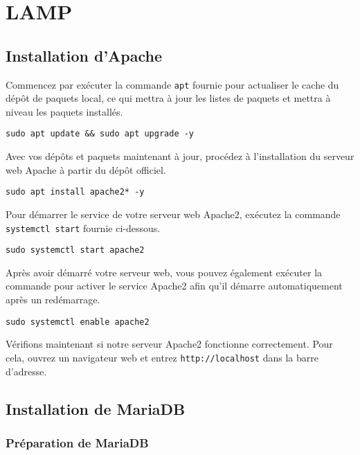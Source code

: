 \chapter{LAMP}

\section{Installation d'Apache}

Commencez par exécuter la commande \texttt{apt} fournie pour actualiser le cache du dépôt de paquets local, ce qui mettra à jour les listes de paquets et mettra à niveau les paquets installés.

\begin{lstlisting}
sudo apt update && sudo apt upgrade -y
\end{lstlisting}

Avec vos dépôts et paquets maintenant à jour, procédez à l'installation du serveur web Apache à partir du dépôt officiel.

\begin{lstlisting}
sudo apt install apache2* -y
\end{lstlisting}

Pour démarrer le service de votre serveur web Apache2, exécutez la commande \texttt{systemctl start} fournie ci-dessous.

\begin{lstlisting}
sudo systemctl start apache2
\end{lstlisting}

Après avoir démarré votre serveur web, vous pouvez également exécuter la commande pour activer le service Apache2 afin qu'il démarre automatiquement après un redémarrage.

\begin{lstlisting}
sudo systemctl enable apache2
\end{lstlisting}

Vérifions maintenant si notre serveur Apache2 fonctionne correctement. Pour cela, ouvrez un navigateur web et entrez \texttt{http://localhost} dans la barre d'adresse.

\section{Installation de MariaDB}

\subsection{Préparation de MariaDB}

